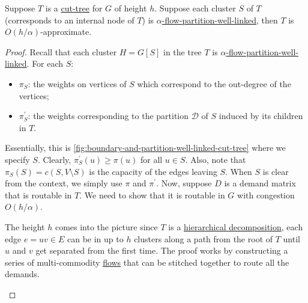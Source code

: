 \begin{lemma}\label{lma:hierarchical-expander-decomposition-characterization}
	Suppose \(T\) is a \hyperref[def:cut-tree]{cut-tree} for \(G\) of height \(h\). Suppose each cluster \(S\) of \(T\) (corresponds to an internal node of \(T\)) is \hyperref[def:partition-and-boundary-well-linked]{\(\alpha \)-flow-partition-well-linked}, then \(T\) is \(O(h / \alpha )\)-approximate.
\end{lemma}
\begin{proof}
	Recall that each cluster \(H= G[S]\) in the tree \(T\) is \hyperref[def:partition-and-boundary-well-linked]{\(\alpha \)-flow-partition-well-linked}. For each \(S\):
	\begin{itemize}
		\item \(\pi _S\): the weights on vertices of \(S\) which correspond to the out-degree of the vertices;
		\item \(\pi _S^{\prime} \): the weights corresponding to the partition \(\mathcal{D} \) of \(S\) induced by its children in \(T\).
	\end{itemize}
	Essentially, this is \autoref{fig:boundary-and-partition-well-linked-cut-tree} where we specify \(S\). Clearly, \(\pi _S^{\prime} (u) \geq \pi (u)\) for all \(u \in S\). Also, note that \(\pi _S(S) = c(S, V\setminus S)\) is the capacity of the edges leaving \(S\). When \(S\) is clear from the context, we simply use \(\pi \) and \(\pi ^{\prime} \). Now, suppose \(D\) is a demand matrix that is routable in \(T\). We need to show that it is routable in \(G\) with congestion \(O(h / \alpha )\).

	\begin{intuition}
		The height \(h\) comes into the picture since \(T\) is a \hyperref[def:hierarchical-decomposition]{hierarchical decomposition}, each edge \(e = uv \in E\) can be in up to \(h\) clusters along a path from the root of \(T\) until \(u\) and \(v\) get separated from the first time. The proof works by constructing a series of multi-commodity \hyperref[def:flow]{flows} that can be stitched together to route all the demands.
	\end{intuition}


\end{proof}
